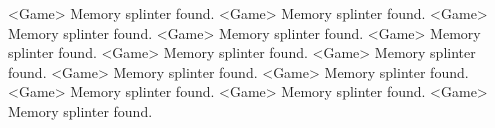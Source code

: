 <Game> Memory splinter found. 
<Game> Memory splinter found. 
<Game> Memory splinter found. 
<Game> Memory splinter found. 
<Game> Memory splinter found. 
<Game> Memory splinter found. 
<Game> Memory splinter found. 
<Game> Memory splinter found. 
<Game> Memory splinter found. 
<Game> Memory splinter found. 
<Game> Memory splinter found. 
<Game> Memory splinter found. 
